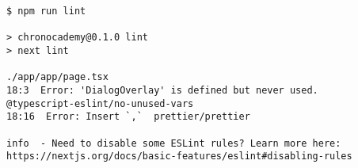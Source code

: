 \begin{verbatim}
$ npm run lint

> chronocademy@0.1.0 lint
> next lint

./app/app/page.tsx
18:3  Error: 'DialogOverlay' is defined but never used.
@typescript-eslint/no-unused-vars
18:16  Error: Insert `,`  prettier/prettier

info  - Need to disable some ESLint rules? Learn more here:
https://nextjs.org/docs/basic-features/eslint#disabling-rules
\end{verbatim}
